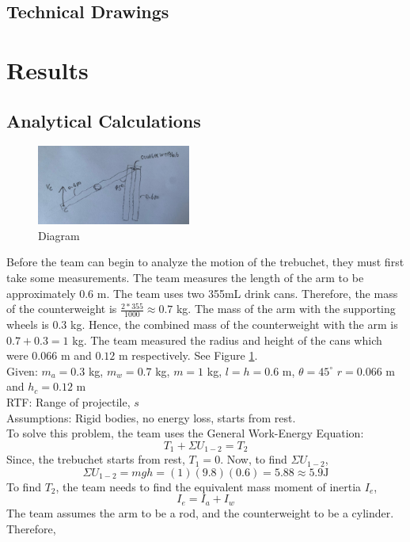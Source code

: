 \documentclass[12pt, titlepage]{article}
\begin{document}
    \subsection{Technical Drawings}
    \newpage
    \section{Results}
    \subsection{Analytical Calculations}
    \begin{figure}[b]                                  
    \centering
    \includegraphics[width=0.45\textwidth]{d1.jpeg}
    \caption{Diagram\label{d1}}
    \end{figure}
    Before the team can begin to analyze the motion of the trebuchet, they must
    first take some measurements. The team measures the length of the arm to be 
    approximately $0.6$ m. The team uses two 355mL drink cans.
    Therefore, the mass of the counterweight is $\frac{2*355}{1000} \approx 0.7$ kg.
    The mass of the arm with the supporting wheels is $0.3$ kg.
    Hence, the combined mass of the counterweight with the arm is 
    $0.7 + 0.3 = 1$ kg. The team measured the radius
    and height of the cans which were $0.066$ m and $0.12$ m respectively. See Figure \ref{d1}.\\[20pt]
    Given: $m_{a} = 0.3$ kg, $m_{w} = 0.7$ kg, $m = 1$ kg, $l = h = 0.6$ m, $\theta = 45^\circ$
    $r = 0.066$ m and $h_c = 0.12$ m\\
    RTF: Range of projectile, $s$\\
    Assumptions: Rigid bodies, no energy loss, starts from rest.\\[10pt]
    To solve this problem, the team uses the General Work-Energy Equation:
    $$T_1 + \Sigma U_{1-2} = T_2$$
    Since, the trebuchet starts from rest, $T_1 = 0$. Now, to find $\Sigma U_{1-2}$,
    $$\Sigma U_{1-2} = mgh = (1)(9.8)(0.6) = 5.88 \approx 5.9 \mathrm{J}$$
    To find $T_2$, the team needs to find the equivalent mass moment of inertia $I_e$,
    $$I_e = I_a + I_w$$
    \newpage
    \noindent The team assumes the arm to be a rod, and the counterweight to be a cylinder. Therefore,
\end{document}
